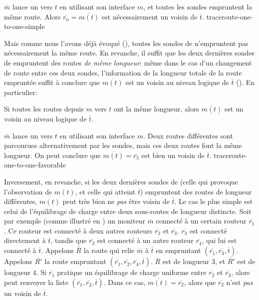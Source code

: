  {$\overline{m}$ lance un \traceroute vers $t$ en utilisant son
interface $m$, et toutes les sondes empruntent la même route. Alors
$\overline{r_n} = \overline{m(t)}$ est nécessairement un voisin de
$\overline{t}$.} {traceroute-one-to-one-simple}

Mais comme nous l'avons déjà évoqué (),
toutes les sondes de \traceroute n'empruntent pas nécessairement la même route.
En revanche, il suffit que les deux dernières sondes de \traceroute empruntent
des routes {\em de même longueur}: même dans le cas d'un changement de route
entre ces deux sondes, l'information de la longueur totale de la route empruntée
suffit à conclure que $\overline{m(t)}$ est un voisin au niveau logique de
$\overline{t}$ (). En particulier:

\begin{proposition} Si toutes les routes depuis $m$ vers $t$ ont la même longueur, alors
$\overline{m(t)}$ est un voisin au niveau logique de $\overline{t}$.
\label{prop:traceroute-one-to-one}
\end{proposition}

 {$\overline{m}$ lance un \traceroute vers $t$ en
utilisant son interface $m$. Deux routes différentes sont parcourues
alternativement par les sondes, mais ces deux routes font la même longueur. On
peut conclure que $\overline{m(t)} = \overline{r_5}$ est bien un voisin de
$\overline{t}$.} {traceroute-one-to-one-favorable}

Inversement, en revanche, si les deux dernières sondes de \traceroute (celle qui
provoque l'observation de $m(t)$, et celle qui atteint $\overline{t}$)
empruntent des routes de longueur différentes, $\overline{m(t)}$ peut très bien
ne {\em pas} être voisin de $\overline{t}$. Le cas le plus simple est celui de
l'équilibrage de charge entre deux sous-routes de longueur distincte. Soit par
exemple (comme illustré en ) un
moniteur $\overline{m}$ connecté à un certain routeur $\overline{r_1}$. Ce
routeur est connecté à deux autres routeurs $\overline{r_2}$ et
$\overline{r_3}$. $\overline{r_3}$ est connecté directement à $\overline{t}$,
tandis que $\overline{r_2}$ est connecté à un autre routeur $\overline{r_4}$,
qui lui est connecté à $\overline{t}$. Appelons $\overline{R}$ la route qui
relie $\overline{m}$ à $\overline{t}$ en empruntant $(\overline{r_1},
\overline{r_3}, \overline{t})$. Appelons $\overline{R'}$ la route empruntant
$(\overline{r_1}, \overline{r_2}, \overline{r_4}, \overline{t})$. $\overline{R}$
est de longueur 3, et $\overline{R'}$ est de longueur 4. Si $\overline{r_1}$
pratique un équilibrage de charge uniforme entre $\overline{r_2}$ et
$\overline{r_3}$, alors \traceroute peut renvoyer la liste $(\overline{r_1},
\overline{r_2}, \overline{t})$. Dans ce cas, $\overline{m(t)} = \overline{r_2}$,
alors que $\overline{r_2}$ n'est {\em pas} un voisin de $\overline{t}$.

